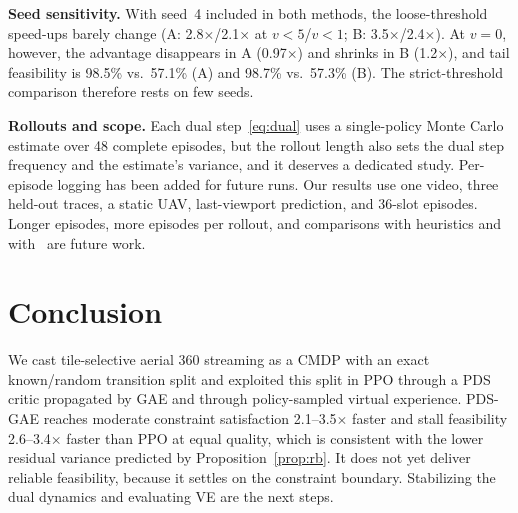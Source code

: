 \documentclass[conference]{IEEEtran}
\begin{document}
\textbf{Seed sensitivity.} With seed~4 included in both methods, the loose-threshold speed-ups barely change (A: 2.8$\times$/2.1$\times$ at $v<5$/$v<1$; B: 3.5$\times$/2.4$\times$). At $v=0$, however, the advantage disappears in A (0.97$\times$) and shrinks in B (1.2$\times$), and tail feasibility is 98.5\% vs.\ 57.1\% (A) and 98.7\% vs.\ 57.3\% (B). The strict-threshold comparison therefore rests on few seeds.

\textbf{Rollouts and scope.} Each dual step~\eqref{eq:dual} uses a single-policy Monte Carlo estimate over 48 complete episodes, but the rollout length also sets the dual step frequency and the estimate's variance, and it deserves a dedicated study. Per-episode logging has been added for future runs. Our results use one video, three held-out traces, a static UAV, last-viewport prediction, and 36-slot episodes. Longer episodes, more episodes per rollout, and comparisons with heuristics and with~\cite{chakareski2025mmsp} are future work.

\section{Conclusion}
We cast tile-selective aerial 360\textdegree{} streaming as a CMDP with an exact known/random transition split and exploited this split in PPO through a PDS critic propagated by GAE and through policy-sampled virtual experience. PDS-GAE reaches moderate constraint satisfaction 2.1--3.5$\times$ faster and stall feasibility 2.6--3.4$\times$ faster than PPO at equal quality, which is consistent with the lower residual variance predicted by Proposition~\ref{prop:rb}. It does not yet deliver reliable feasibility, because it settles on the constraint boundary. Stabilizing the dual dynamics and evaluating VE are the next steps.
\end{document}
